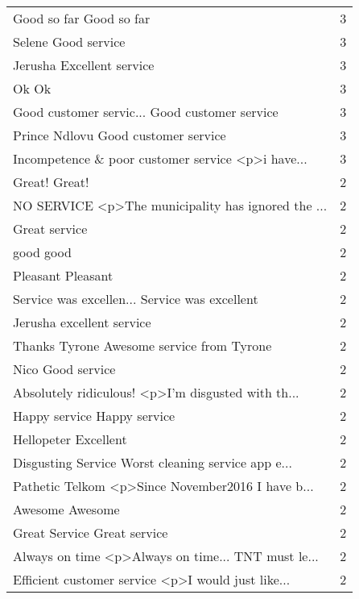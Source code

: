 \begin{tabular}{lr}
Good so far Good so far                            &        3 \\
Selene Good service                                &        3 \\
Jerusha Excellent service                          &        3 \\
Ok Ok                                              &        3 \\
Good customer servic... Good customer service      &        3 \\
Prince Ndlovu Good customer service                &        3 \\
Incompetence \& poor customer service  <p>i have... &        3 \\
Great! Great!                                      &        2 \\
NO SERVICE <p>The municipality has ignored the ... &        2 \\
Great service                                      &        2 \\
good good                                          &        2 \\
Pleasant Pleasant                                  &        2 \\
Service was excellen... Service was excellent      &        2 \\
Jerusha excellent service                          &        2 \\
Thanks Tyrone Awesome service from Tyrone          &        2 \\
Nico Good service                                  &        2 \\
Absolutely ridiculous! <p>I'm disgusted with th... &        2 \\
Happy service Happy service                        &        2 \\
Hellopeter Excellent                               &        2 \\
Disgusting Service Worst cleaning service app e... &        2 \\
Pathetic Telkom  <p>Since November2016 I have b... &        2 \\
Awesome Awesome                                    &        2 \\
Great Service Great service                        &        2 \\
Always on time <p>Always on time... TNT must le... &        2 \\
Efficient customer service <p>I would just like... &        2 \\

\end{tabular}

